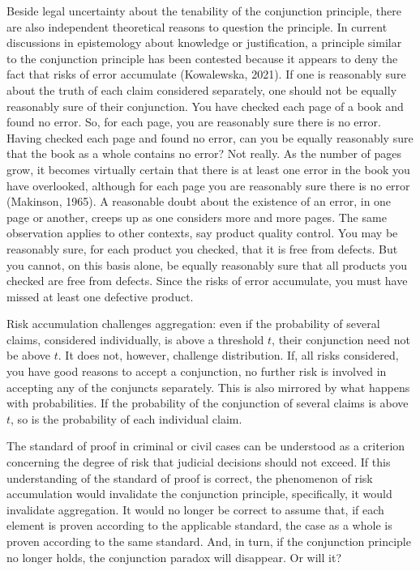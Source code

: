 \documentclass[
  10pt,
  dvipsnames,enabledeprecatedfontcommands]{scrartcl}
\newcommand{\mar}[1]{\todo[color=blue!40]{#1}}
\begin{document}
Beside legal uncertainty about the tenability of the conjunction
principle, there are also independent theoretical reasons to question
the principle. In current discussions in epistemology about knowledge or
justification, a principle similar to the conjunction principle has been
contested because it appears to deny the fact that risks of error
accumulate (Kowalewska, 2021). If one is reasonably sure about the truth
of each claim considered separately, one should not be equally
reasonably sure of their conjunction. You have checked each page of a
book and found no error. So, for each page, you are reasonably sure
there is no error. Having checked each page and found no error, can you
be equally reasonably sure that the book as a whole contains no error?
Not really. As the number of pages grow, it becomes virtually certain
that there is at least one error in the book you have overlooked,
although for each page you are reasonably sure there is no error
(Makinson, 1965). A reasonable doubt about the existence of an error, in
one page or another, creeps up as one considers more and more pages. The
same observation applies to other contexts, say product quality control.
You may be reasonably sure, for each product you checked, that it is
free from defects. But you cannot, on this basis alone, be equally
reasonably sure that all products you checked are free from defects.
Since the risks of error accumulate, you must have missed at least one
defective product.

Risk accumulation challenges aggregation: even if the probability of
several claims, considered individually, is above a threshold \(t\),
their conjunction need not be above \(t\). It does not, however,
challenge distribution. If, all risks considered, you have good reasons
to accept a conjunction, no further risk is involved in accepting any of
the conjuncts separately. This is also mirrored by what happens with
probabilities. If the probability of the conjunction of several claims
is above \(t\), so is the probability of each individual claim.
\mar{R: What's our take on risk accummulation?}

The standard of proof in criminal or civil cases can be understood as a
criterion concerning the degree of risk that judicial decisions should
not exceed. If this understanding of the standard of proof is correct,
the phenomenon of risk accumulation would invalidate the conjunction
principle, specifically, it would invalidate aggregation. It would no
longer be correct to assume that, if each element is proven according to
the applicable standard, the case as a whole is proven according to the
same standard. And, in turn, if the conjunction principle no longer
holds, the conjunction paradox will disappear. Or will it?
\end{document}
